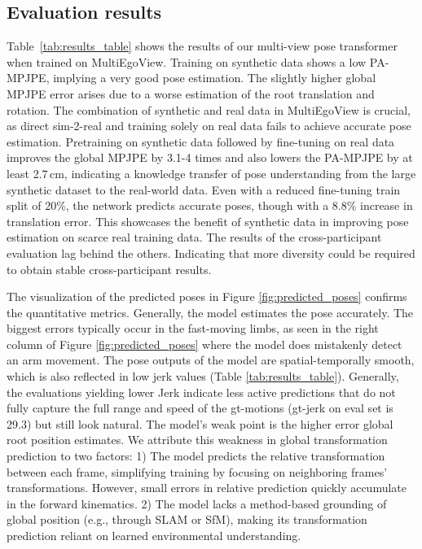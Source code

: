 \subsection{Evaluation results}


Table~\ref{tab:results_table} shows the results of our multi-view pose transformer when trained on MultiEgoView. 
Training on synthetic data shows a low PA-MPJPE, implying a very good pose estimation. 
The slightly higher global MPJPE error arises due to a worse estimation of the root translation and rotation. 
The combination of synthetic and real data in MultiEgoView is crucial, as direct sim-2-real and training solely on real data fails to achieve accurate pose estimation. Pretraining on synthetic data followed by fine-tuning on real data improves the global MPJPE by 3.1-4 times and also lowers the PA-MPJPE by at least 2.7\,cm, indicating a knowledge transfer of pose understanding from the large synthetic dataset to the real-world data. 
Even with a reduced fine-tuning train split of 20\%, the network predicts accurate poses, though with a 8.8\% increase in translation error. 
This showcases the benefit of synthetic data in improving pose estimation on scarce real training data.
The results of the cross-participant evaluation lag behind the others. Indicating that more diversity could be required to obtain stable cross-participant results. 

The visualization of the predicted poses in Figure \ref{fig:predicted_poses} confirms the quantitative metrics. 
Generally, the model estimates the pose accurately. The biggest errors typically occur in the fast-moving limbs, as seen in the right column of Figure \ref{fig:predicted_poses} where the model does mistakenly detect an arm movement. 
The pose outputs of the model are spatial-temporally smooth, which is also reflected in low jerk values (Table \ref{tab:results_table}). Generally, the evaluations yielding lower Jerk indicate less active predictions that do not fully capture the full range and speed of the gt-motions (gt-jerk on eval set is 29.3) but still look natural.  
The model's weak point is the higher error global root position estimates. 
We attribute this weakness in global transformation prediction to two factors: 1) The model predicts the relative transformation between each frame, simplifying training by focusing on neighboring frames' transformations. However, small errors in relative prediction quickly accumulate in the forward kinematics. 2) The model lacks a method-based grounding of global position (e.g., through SLAM or SfM), making its transformation prediction reliant on learned environmental understanding.

